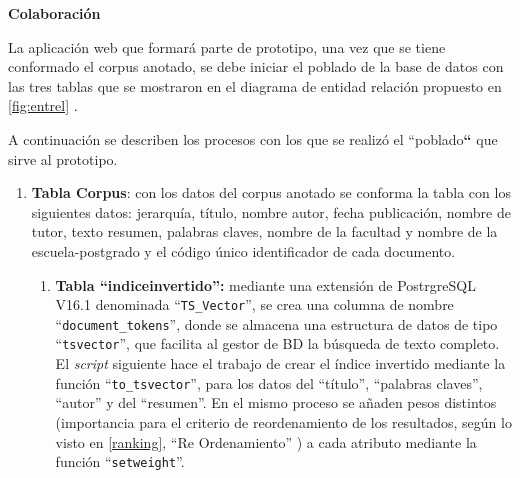 \documentclass[
  12pt,
  openany]{book}
\begin{document}
\textbf{Colaboración}

La aplicación web que formará parte de prototipo, una vez que se tiene conformado el corpus anotado, se debe iniciar el poblado de la base de datos con las tres tablas que se mostraron en el diagrama de entidad relación propuesto en \ref{fig:entrel} .

A continuación se describen los procesos con los que se realizó el ``poblado\textbf{``} que sirve al prototipo.

\begin{enumerate}
\def\labelenumi{\arabic{enumi}.}
\item
  \textbf{Tabla Corpus}: con los datos del corpus anotado se conforma la tabla con los siguientes datos: jerarquía, título, nombre autor, fecha publicación, nombre de tutor, texto resumen, palabras claves, nombre de la facultad y nombre de la escuela-postgrado y el código único identificador de cada documento.

  \begin{enumerate}
  \def\labelenumii{\arabic{enumii}.}
  \item
    \textbf{Tabla ``indiceinvertido'':} mediante una extensión de PostrgreSQL V16.1 denominada ``\texttt{TS\_Vector}'', se crea una columna de nombre ``\texttt{document\_tokens}'', donde se almacena una estructura de datos de tipo ``\texttt{tsvector}'', que facilita al gestor de BD la búsqueda de texto completo. El \emph{script} siguiente hace el trabajo de crear el índice invertido mediante la función ``\texttt{to\_tsvector}'', para los datos del ``título'', ``palabras claves'', ``autor'' y del ``resumen''. En el mismo proceso se añaden pesos distintos (importancia para el criterio de reordenamiento de los resultados, según lo visto en \ref{ranking}, ``Re Ordenamiento'' ) a cada atributo mediante la función ``\texttt{setweight}''.

    \newpage


\end{enumerate}
\end{enumerate}
\end{document}
